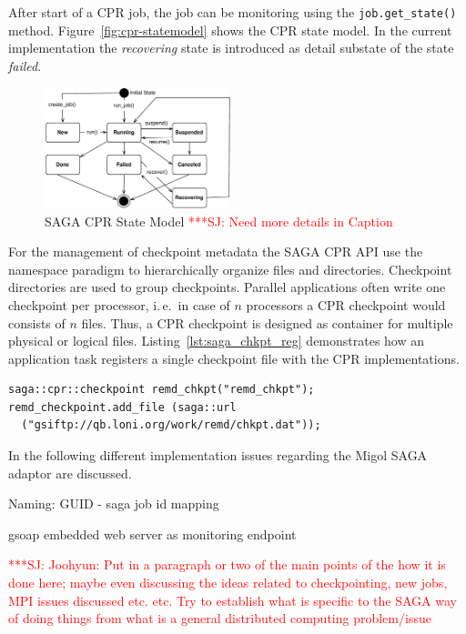 \documentclass[times, 10pt,twocolumn]{article}
\newcommand{\jhanote}[1]{ {\textcolor{red} { ***SJ: #1 }}}
\begin{document}
After start of a CPR job, the job can be monitoring using the \texttt{job.get\_state()} method. Figure~\ref{fig:cpr-statemodel} shows the CPR state model. In the current implementation the \emph{recovering} state is introduced as detail substate of the state \emph{failed}.
\begin{figure}[th]
    \centering
        \includegraphics[width=0.48\textwidth]{cpr-statemodel.pdf}
    \caption{SAGA CPR State Model \jhanote{Need more details in Caption} }
    \label{fig:cpr-statemodel }
\end{figure}
                               

For the management of checkpoint metadata the SAGA CPR API use the namespace paradigm to hierarchically 
organize files and directories. Checkpoint directories are 
used to group checkpoints. Parallel applications often write one checkpoint per 
processor, i.\,e.\ in case of $n$ processors a CPR checkpoint
would consists of $n$ files. Thus, a CPR checkpoint is designed as container 
for multiple physical or logical files. Listing~\ref{lst:saga_chkpt_reg} demonstrates how an application task registers a single checkpoint file with the CPR implementations.     
\begin{lstlisting}[style=myListing, caption={SAGA CPR: Register Checkpoint with Migol}, label={lst:saga_chkpt_reg}]
saga::cpr::checkpoint remd_chkpt("remd_chkpt");
remd_checkpoint.add_file (saga::url 
  ("gsiftp://qb.loni.org/work/remd/chkpt.dat"));
\end{lstlisting}

In the following different implementation issues regarding the Migol SAGA adaptor are discussed.

\label{sec:saga_cpr_migol_adaptor}
                  
Naming: GUID - saga job id mapping

gsoap embedded web server as monitoring endpoint



\jhanote{Joohyun: Put in a paragraph or two of the main points of the
  how it is done here; maybe even discussing the ideas related to
  checkpointing, new jobs, MPI issues discussed etc. etc. Try to
  establish what is specific to the SAGA way of doing things from what
  is a general distributed computing problem/issue}
\end{document}
